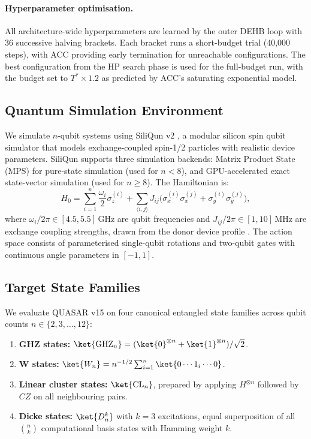 \paragraph{Hyperparameter optimisation.}
All architecture-wide hyperparameters are learned by the outer DEHB loop
\cite{awad2021dehb} with 36 successive halving brackets. Each bracket runs a
short-budget trial (40,000 steps), with ACC providing early termination for
unreachable configurations. The best configuration from the HP search phase
is used for the full-budget run, with the budget set to $T^* \times 1.2$ as
predicted by ACC's saturating exponential model.

\subsection{Quantum Simulation Environment}

We simulate $n$-qubit systems using SiliQun v2 \cite{TODO_siliqun}, a
modular silicon spin qubit simulator that models exchange-coupled spin-1/2
particles with realistic device parameters. SiliQun supports three simulation
backends: Matrix Product State (MPS) for pure-state simulation (used for
$n < 8$), and GPU-accelerated exact state-vector simulation (used for
$n \geq 8$). The Hamiltonian is:
\begin{equation}
  H_0 = \sum_{i=1}^{n} \frac{\omega_i}{2} \sigma_z^{(i)}
        + \sum_{\langle i,j\rangle} J_{ij} \bigl(\sigma_x^{(i)}\sigma_x^{(j)}
        + \sigma_y^{(i)}\sigma_y^{(j)}\bigr),
\end{equation}
where $\omega_i / 2\pi \in [4.5, 5.5]\,\mathrm{GHz}$ are qubit frequencies and
$J_{ij} / 2\pi \in [1, 10]\,\mathrm{MHz}$ are exchange coupling strengths,
drawn from the donor device profile \cite{TODO_siliqun}. The action space
consists of parameterised single-qubit rotations and two-qubit gates with
continuous angle parameters in $[-1, 1]$.

\subsection{Target State Families}

We evaluate QUASAR v15 on four canonical entangled state families across
qubit counts $n \in \{2, 3, \ldots, 12\}$:
\begin{enumerate}
  \item \textbf{GHZ states:} $\ket{\mathrm{GHZ}_n} = (\ket{0}^{\otimes n} + \ket{1}^{\otimes n})/\sqrt{2}$.
  \item \textbf{W states:} $\ket{W_n} = n^{-1/2}\sum_{i=1}^{n}\ket{0\cdots 1_i \cdots 0}$.
  \item \textbf{Linear cluster states:} $\ket{\mathrm{CL}_n}$, prepared by
    applying $H^{\otimes n}$ followed by $CZ$ on all neighbouring pairs.
  \item \textbf{Dicke states:} $\ket{D_n^k}$ with $k = 3$ excitations,
    equal superposition of all $\binom{n}{k}$ computational basis states
    with Hamming weight $k$.
\end{enumerate}

